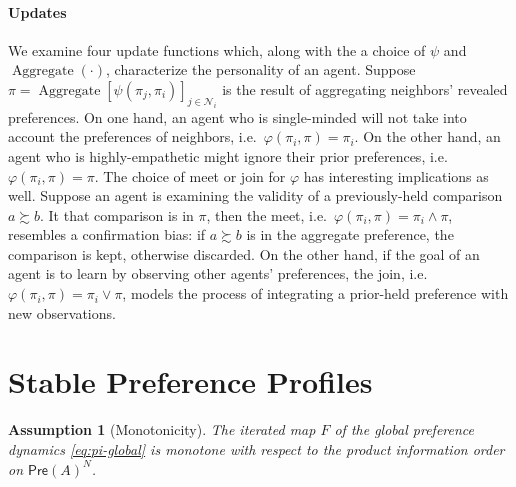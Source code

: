 \documentclass[conference]{ieeeconf}
\newcommand{\N}{\mathcal{N}}
\newcommand{\A}{\mathcal{A}}
\newcommand{\Pref}{\mathsf{Pre}}
\newcommand{\prefers}{\succsim}
\newcommand{\profile}{\boldsymbol{\pi}}
\newcommand{\join}{\vee}
\newcommand{\meet}{\wedge}
\DeclareMathOperator{\Aggregate}{Aggregate}
\newtheorem{assumption}{Assumption}
\begin{document}
\paragraph*{Updates}
We examine four update functions which, along with the a choice of $\psi$ and $\Aggregate(\cdot)$, characterize the personality of an agent. Suppose $\pi = \Aggregate\left[\psi(\pi_j,\pi_i)\right]_{j \in \N_i}$ is the result of aggregating neighbors' revealed preferences. On one hand, an agent who is single-minded will not take into account the preferences of neighbors, i.e.~$\varphi(\pi_i,\pi) = \pi_i$. On the other hand, an agent who is highly-empathetic might ignore their prior preferences, i.e.~$\varphi(\pi_i,\pi) = \pi$. The choice of meet or join for $\varphi$ has interesting implications as well. Suppose an agent is examining the validity of a previously-held comparison $a \prefers b$. It that comparison is in $\pi$, then the meet, i.e.~$\varphi(\pi_i,\pi) = \pi_i \meet \pi$, resembles a confirmation bias: if $a \prefers b$ is in the aggregate preference, the comparison is kept, otherwise discarded. On the other hand, if the goal of an agent is to learn by observing other agents' preferences, the join, i.e.~$\varphi(\pi_i,\pi) = \pi_i \join \pi$, models the process of integrating a prior-held preference with new observations.

\section{Stable Preference Profiles}
\label{sec:stable}


\begin{assumption}[Monotonicity] \label{ass:monotone}
    The iterated map $F$ of the global preference dynamics \eqref{eq:pi-global} is monotone with respect to the product information order on $\Pref(A)^N$.
\end{assumption}
\end{document}
